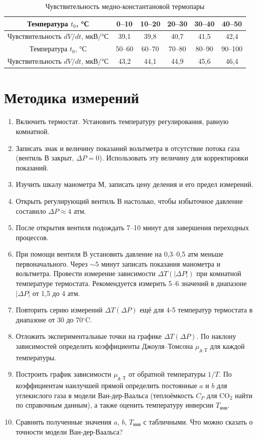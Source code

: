 \documentclass[a4paper]{article}
\begin{document}
	\begin{table}[h]
		\centering
		\caption{Чувствительность медно-константановой термопары}
		\begin{tabular}{|c|c|c|c|c|c|}
			\hline
			Температура $t_0$, °С & 0–10 & 10–20 & 20–30 & 30–40 & 40–50 \\
			\hline
			Чувствительность $dV/dt$, мкВ/°С & 39,1 & 39,8 & 40,7 & 41,5 & 42,4 \\
			\hline
			Температура $t_0$, °С & 50–60 & 60–70 & 70–80 & 80–90 & 90–100 \\
			\hline
			Чувствительность $dV/dt$, мкВ/°С & 43,2 & 44,1 & 44,9 & 45,6 & 46,4 \\
			\hline
		\end{tabular}
	\end{table}
	

	\section{Методика измерений}
\begin{enumerate}
	\item Включить термостат. Установить температуру регулирования, равную комнатной.
	\item Записать знак и величину показаний вольтметра в отсутствие потока газа (вентиль В закрыт, $\Delta P = 0$). Использовать эту величину для корректировки показаний.
	\item Изучить шкалу манометра М, записать цену деления и его предел измерений.
	\item Открыть регулирующий вентиль В настолько, чтобы избыточное давление составило $\Delta P \approx 4$ атм.
	\item После открытия вентиля подождать 7–10 минут для завершения переходных процессов.
	\item При помощи вентиля В установить давление на 0,3--0,5 атм меньше первоначального. Через $\sim 5$ минут записать показания манометра и вольтметра. Провести измерение зависимости $\Delta T(|\Delta P|)$ при комнатной температуре термостата. Рекомендуется измерить 5–6 значений в диапазоне $|\Delta P|$ от 1,5 до 4 атм.
	\item Повторить серию измерений $\Delta T(\Delta P)$ ещё для 4-5 температур термостата в диапазоне от 30 до 70$^\circ$C.
	\item Отложить экспериментальные точки на графике $\Delta T(\Delta P)$. По наклону зависимостей определить коэффициенты Джоуля--Томсона $\mu_{\text{д--Т}}$ для каждой температуры.
	\item Построить график зависимости $\mu_{\text{д--Т}}$ от обратной температуры $1/T$. По коэффициентам наилучшей прямой определить постоянные $a$ и $b$ для углекислого газа в модели Ван-дер-Ваальса (теплоёмкость $C_P$ для CO$_2$ найти по справочным данным), а также оценить температуру инверсии $T_{\text{инв}}$.
	\item Сравнить полученные значения $a$, $b$, $T_{\text{инв}}$ с табличными. Что можно сказать о точности модели Ван-дер-Ваальса?
\end{enumerate}
\end{document}
